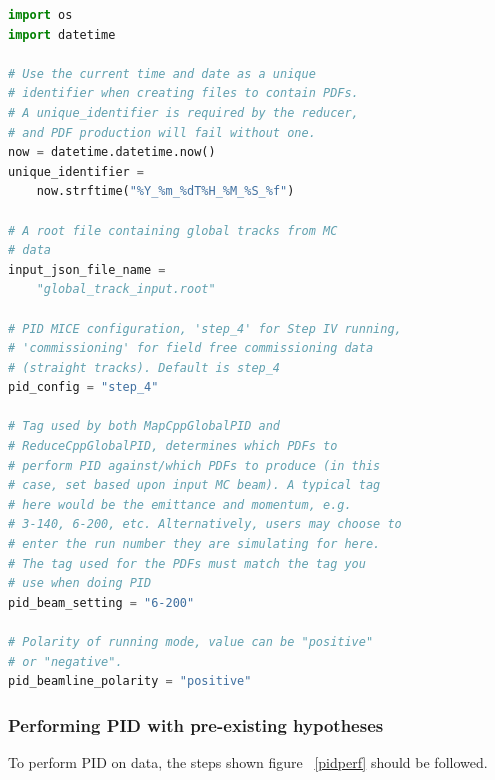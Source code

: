 \vspace*{1\baselineskip}

\begin{lstlisting}[language=Python,basicstyle=\ttfamily,frame=single,captionpos=b,caption={An example datacard (pdf\_example\_datacard.py) for use with pid\_pdf\_generator.py},label=pdfdatacard]
import os
import datetime

# Use the current time and date as a unique
# identifier when creating files to contain PDFs. 
# A unique_identifier is required by the reducer, 
# and PDF production will fail without one.
now = datetime.datetime.now()
unique_identifier = 
	now.strftime("%Y_%m_%dT%H_%M_%S_%f")

# A root file containing global tracks from MC
# data
input_json_file_name = 
	"global_track_input.root"

# PID MICE configuration, 'step_4' for Step IV running,
# 'commissioning' for field free commissioning data
# (straight tracks). Default is step_4
pid_config = "step_4"

# Tag used by both MapCppGlobalPID and
# ReduceCppGlobalPID, determines which PDFs to
# perform PID against/which PDFs to produce (in this
# case, set based upon input MC beam). A typical tag
# here would be the emittance and momentum, e.g.
# 3-140, 6-200, etc. Alternatively, users may choose to
# enter the run number they are simulating for here.
# The tag used for the PDFs must match the tag you
# use when doing PID
pid_beam_setting = "6-200"

# Polarity of running mode, value can be "positive"
# or "negative".
pid_beamline_polarity = "positive"

\end{lstlisting}


\vspace*{2\baselineskip}


\subsubsection{Performing PID with pre-existing hypotheses}
\label{pid_perf}
To perform PID on data, the steps shown figure ~\ref{pidperf} should be followed.

